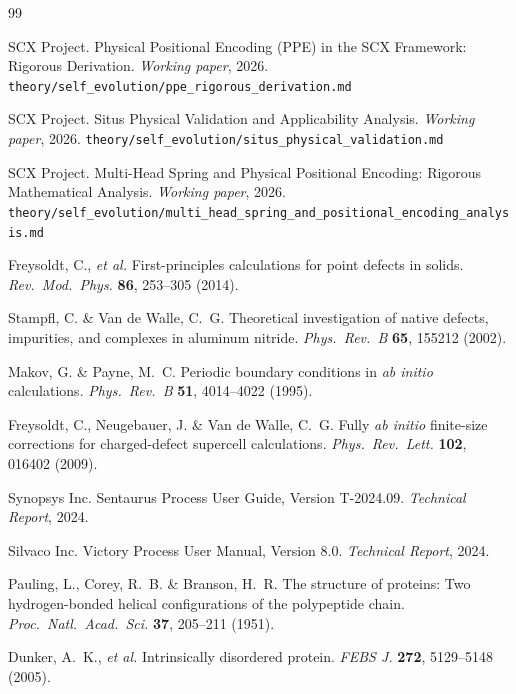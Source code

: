\documentclass[12pt,a4paper]{article}
\begin{document}
\begin{thebibliography}{99}

SCX Project. Physical Positional Encoding (PPE) in the SCX Framework: Rigorous Derivation. \textit{Working paper}, 2026. \texttt{theory/self\_evolution/ppe\_rigorous\_derivation.md}

SCX Project. Situs Physical Validation and Applicability Analysis. \textit{Working paper}, 2026. \texttt{theory/self\_evolution/situs\_physical\_validation.md}

SCX Project. Multi-Head Spring and Physical Positional Encoding: Rigorous Mathematical Analysis. \textit{Working paper}, 2026. \texttt{theory/self\_evolution/multi\_head\_spring\_and\_positional\_encoding\_analysis.md}

Freysoldt, C., \emph{et al.} First-principles calculations for point defects in solids. \textit{Rev.\ Mod.\ Phys.} \textbf{86}, 253--305 (2014).

Stampfl, C. \& Van de Walle, C.\ G. Theoretical investigation of native defects, impurities, and complexes in aluminum nitride. \textit{Phys.\ Rev.\ B} \textbf{65}, 155212 (2002).

Makov, G. \& Payne, M.\ C. Periodic boundary conditions in \emph{ab initio} calculations. \textit{Phys.\ Rev.\ B} \textbf{51}, 4014--4022 (1995).

Freysoldt, C., Neugebauer, J. \& Van de Walle, C.\ G. Fully \emph{ab initio} finite-size corrections for charged-defect supercell calculations. \textit{Phys.\ Rev.\ Lett.} \textbf{102}, 016402 (2009).

Synopsys Inc. Sentaurus Process User Guide, Version T-2024.09. \textit{Technical Report}, 2024.

Silvaco Inc. Victory Process User Manual, Version 8.0. \textit{Technical Report}, 2024.

Pauling, L., Corey, R.\ B. \& Branson, H.\ R. The structure of proteins: Two hydrogen-bonded helical configurations of the polypeptide chain. \textit{Proc.\ Natl.\ Acad.\ Sci.} \textbf{37}, 205--211 (1951).

Dunker, A.\ K., \emph{et al.} Intrinsically disordered protein. \textit{FEBS J.} \textbf{272}, 5129--5148 (2005).


\end{thebibliography}
\end{document}
